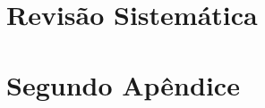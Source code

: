 \begin{apendicesenv}

\partapendices

\chapter{Revisão Sistemática}
\label{sec:revisão_sistemática}



\chapter{Segundo Apêndice}
\label{sec:desenvolvimento_prático}



\end{apendicesenv}

